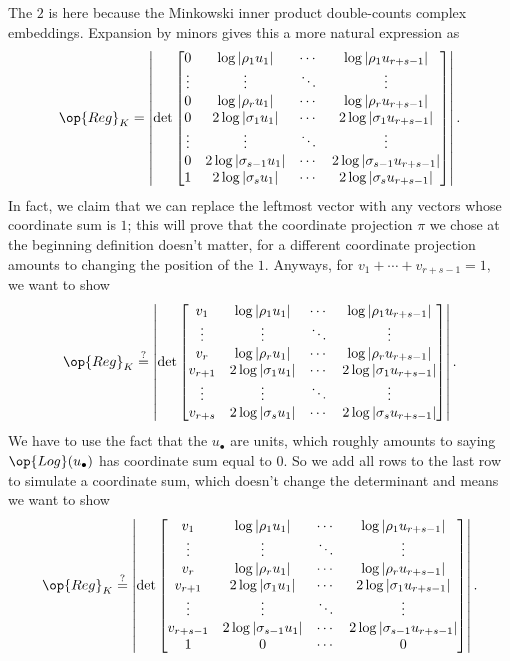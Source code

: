 The $2$ is here because the Minkowski inner product double-counts complex embeddings. Expansion by minors gives this a more natural expression as
\[\op{Reg}_K=\left|\det\begin{bmatrix}
    0 & \log|\rho_1u_1| & \cdots & \log|\rho_1u_{r+s-1}| \\
    \vdots & \vdots & \ddots & \vdots \\
    0 & \log|\rho_ru_1| & \cdots & \log|\rho_ru_{r+s-1}| \\
    0 & 2\log|\sigma_1u_1| & \cdots & 2\log|\sigma_1u_{r+s-1}| \\
    \vdots & \vdots & \ddots & \vdots \\
    0 & 2\log|\sigma_{s-1}u_1| & \cdots & 2\log|\sigma_{s-1}u_{r+s-1}| \\
    1 & 2\log|\sigma_su_1| & \cdots & 2\log|\sigma_su_{r+s-1}| \\
\end{bmatrix}\right|.\]
In fact, we claim that we can replace the leftmost vector with any vectors whose coordinate sum is $1$; this will prove that the coordinate projection $\pi$ we chose at the beginning definition doesn't matter, for a different coordinate projection amounts to changing the position of the $1.$ Anyways, for $v_1+\cdots+v_{r+s-1}=1,$ we want to show
\[\op{Reg}_K\stackrel?=\left|\det\begin{bmatrix}
    v_1 & \log|\rho_1u_1| & \cdots & \log|\rho_1u_{r+s-1}| \\
    \vdots & \vdots & \ddots & \vdots \\
    v_r & \log|\rho_ru_1| & \cdots & \log|\rho_ru_{r+s-1}| \\
    v_{r+1} & 2\log|\sigma_1u_1| & \cdots & 2\log|\sigma_1u_{r+s-1}| \\
    \vdots & \vdots & \ddots & \vdots \\
    v_{r+s} & 2\log|\sigma_su_1| & \cdots & 2\log|\sigma_su_{r+s-1}| \\
\end{bmatrix}\right|.\]
We have to use the fact that the $u_\bullet$ are units, which roughly amounts to saying $\op{Log}(u_\bullet)$ has coordinate sum equal to $0.$ So we add all rows to the last row to simulate a coordinate sum, which doesn't change the determinant and means we want to show
\[\op{Reg}_K\stackrel?=\left|\det\begin{bmatrix}
    v_1 & \log|\rho_1u_1| & \cdots & \log|\rho_1u_{r+s-1}| \\
    \vdots & \vdots & \ddots & \vdots \\
    v_r & \log|\rho_ru_1| & \cdots & \log|\rho_ru_{r+s-1}| \\
    v_{r+1} & 2\log|\sigma_1u_1| & \cdots & 2\log|\sigma_1u_{r+s-1}| \\
    \vdots & \vdots & \ddots & \vdots \\
    v_{r+s-1} & 2\log|\sigma_{s-1}u_1| & \cdots & 2\log|\sigma_{s-1}u_{r+s-1}| \\
    1 & 0 & \cdots & 0 \\
\end{bmatrix}\right|.\]
